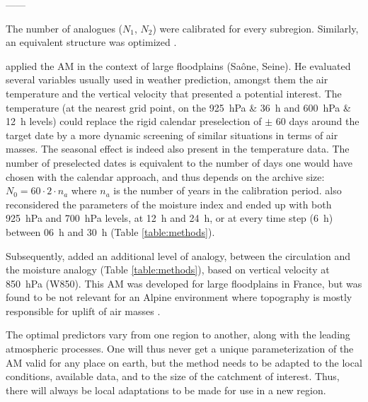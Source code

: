 \documentclass[review]{elsarticle}
\begin{document}
------

 

 










 The number of analogues ($N_{1}$, $N_{2}$) were calibrated for every subregion. Similarly, an equivalent structure was optimized \citep[PC-4Zgo-2MIgo,][]{Horton2016b}. 

\citet{BenDaoud2010} applied the AM in the context of large floodplains (Sa\^{o}ne, Seine). He evaluated several variables usually used in weather prediction, amongst them the air temperature and the vertical velocity that presented a potential interest. The temperature (at the nearest grid point, on the 925~hPa \& 36~h and 600~hPa \& 12~h levels) could replace the rigid calendar preselection of $\pm$ 60 days around the target date by a more dynamic screening of similar situations in terms of air masses. The seasonal effect is indeed also present in the temperature data. The number of preselected dates is equivalent to the number of days one would have chosen with the calendar approach, and thus depends on the archive size: $N_{0} = 60 \cdot 2 \cdot n_{a}$ where $n_{a}$ is the number of years in the calibration period. \citet{BenDaoud2010} also reconsidered the parameters of the moisture index and ended up with both 925~hPa and 700~hPa levels, at 12~h and 24~h, or at every time step (6~h) between 06~h and 30~h (Table \ref{table:methods}).

Subsequently, \citet{BenDaoud2010} added an additional level of analogy, between the circulation and the moisture analogy (Table \ref{table:methods}), based on vertical velocity at 850~hPa (W850). This AM was developed for large floodplains in France, but was found to be not relevant for an Alpine environment where topography is mostly responsible for uplift of air masses \citep{Horton2012}. 

The optimal predictors vary from one region to another, along with the leading atmospheric processes. One will thus never get a unique parameterization of the AM valid for any place on earth, but the method needs to be adapted to the local conditions, available data, and to the size of the catchment of interest. Thus, there will always be local adaptations to be made for use in a new region.
\end{document}
